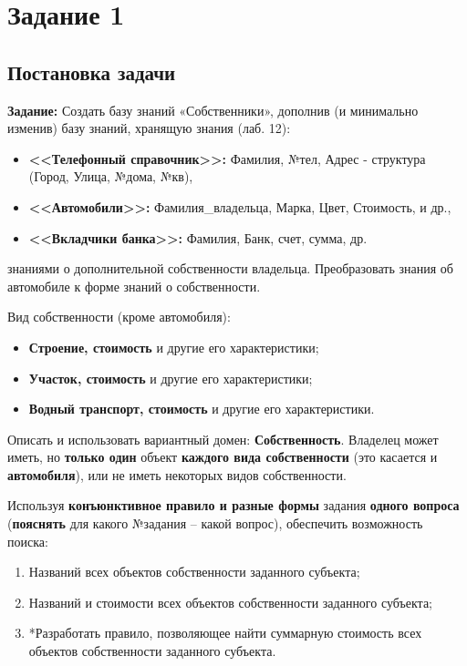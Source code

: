 \section*{Задание 1}
 \subsection*{Постановка задачи}
\textbf{Задание:} Создать базу знаний «Собственники», дополнив (и минимально изменив) базу
знаний, хранящую знания (лаб. 12):
\begin{itemize}
    \item \textbf{<<Телефонный справочник>>:} Фамилия, №тел, Адрес - структура (Город, Улица, №дома, №кв),
    \item \textbf{<<Автомобили>>:} Фамилия\_владельца, Марка, Цвет, Стоимость, и др.,
    \item \textbf{<<Вкладчики банка>>:} Фамилия, Банк, счет, сумма, др.
\end{itemize}
знаниями о дополнительной собственности владельца. Преобразовать знания об
автомобиле к форме знаний о собственности.

Вид собственности (кроме автомобиля):
\begin{itemize}
\item  \textbf{Строение, стоимость} и другие его характеристики;
\item  \textbf{Участок, стоимость} и другие его характеристики;
\item  \textbf{Водный транспорт, стоимость} и другие его характеристики.
\end{itemize}

Описать и использовать вариантный домен: \textbf{Собственность}. Владелец может иметь,
но  \textbf{только один} объект  \textbf{каждого вида собственности} (это касается и  \textbf{автомобиля}), или не иметь некоторых видов собственности. 

Используя  \textbf{конъюнктивное правило и
разные формы} задания  \textbf{одного вопроса} (\textbf{пояснять} для какого №задания – какой вопрос),
обеспечить возможность поиска:
\begin{enumerate}
\item Названий всех объектов собственности заданного субъекта;
\item Названий и стоимости всех объектов собственности заданного субъекта;
\item *Разработать правило, позволяющее найти суммарную стоимость всех
объектов собственности заданного субъекта.
\end{enumerate}

